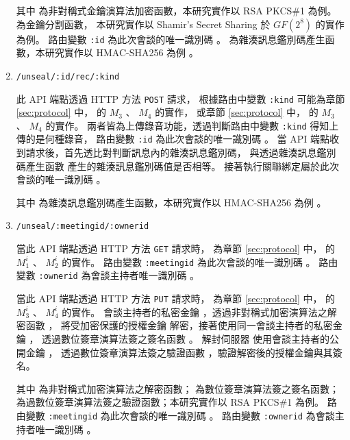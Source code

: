 \begin{enumerate}
        其中 \DEFfuncEncPK{} 為非對稱式金鑰演算法加密函數，本研究實作以 RSA PKCS\#1 \cite{rfc8017} 為例。
    \DEFfuncSSS{} 為金鑰分割函數，
    本研究實作以 Shamir's Secret Sharing \cite{shamir1979share} 於 $GF(2^8)$ 的實作 \cite{117146} 為例。
    路由變數 \texttt{:id} 為此次會談的唯一識別碼 \DEFsessionID。
    \DEFfuncHMAC{} 為雜湊訊息鑑別碼產生函數，本研究實作以 HMAC-SHA256 為例 \cite{rfc2104}。

    \item \texttt{/unseal/:id/rec/:kind}

        此 API 端點透過 HTTP 方法 \texttt{POST} 請求，
    根據路由中變數 \texttt{:kind} 可能為章節 \ref{sec:protocol} 中，
     的 $M_{3}$ 、 $M_{4}$ 的實作，
    或章節 \ref{sec:protocol} 中，
     的 $M_{3}$ 、 $M_{4}$ 的實作。
    兩者皆為上傳錄音功能，透過判斷路由中變數 \texttt{:kind} 得知上傳的是何種錄音，
    路由變數 \texttt{:id} 為此次會談的唯一識別碼 \DEFsessionID。
    當 API 端點收到請求後，首先透比對判斷訊息內的雜湊訊息鑑別碼，
    與透過雜湊訊息鑑別碼產生函數 \DEFfuncHMAC{} 產生的雜湊訊息鑑別碼值是否相等。
    接著執行關聯綁定屬於此次會談的唯一識別碼 \DEFsessionID。

        其中\DEFfuncHMAC{} 為雜湊訊息鑑別碼產生函數，本研究實作以 HMAC-SHA256 為例 \cite{rfc2104}。

    \item \texttt{/unseal/:meetingid/:ownerid}

        當此 API 端點透過 HTTP 方法 \texttt{GET} 請求時，
    為章節 \ref{sec:protocol} 中，
     的 $M_{1}^{i}$ 、 $M_{2}^{i}$ 的實作。
    路由變數 \texttt{:meetingid} 為此次會談的唯一識別碼 \DEFsessionID。
    路由變數 \texttt{:ownerid} 為會談主持者唯一識別碼 \DEFownerID。

        當此 API 端點透過 HTTP 方法 \texttt{PUT} 請求時，
    為章節 \ref{sec:protocol} 中，
     的 $M_{3}^{i}$ 、 $M_{4}^{i}$ 的實作。
    會談主持者的私密金鑰 \DEFprivateKey，透過非對稱式加密演算法之解密函數 \DEFfuncDecSK{}，
    將受加密保護的授權金鑰 \DEFakEnc 解密，接著使用同一會談主持者的私密金鑰 \DEFprivateKey，
    透過數位簽章演算法簽之簽名函數 \DEFfuncSignSK{}。
    解封伺服器 \DEFserver 使用會談主持者的公開金鑰 \DEFpublicKey，
    透過數位簽章演算法簽之驗證函數 \DEFfuncVerfPK{}，驗證解密後的授權金鑰與其簽名。

        其中 \DEFfuncDecSK{} 為非對稱式加密演算法之解密函數；\DEFfuncSignSK{} 為數位簽章演算法簽之簽名函數；
    \DEFfuncVerfPK{} 為過數位簽章演算法簽之驗證函數；本研究實作以 RSA PKCS\#1 \cite{rfc8017} 為例。
    路由變數 \texttt{:meetingid} 為此次會談的唯一識別碼 \DEFsessionID。
    路由變數 \texttt{:ownerid} 為會談主持者唯一識別碼 \DEFownerID。


\end{enumerate}
